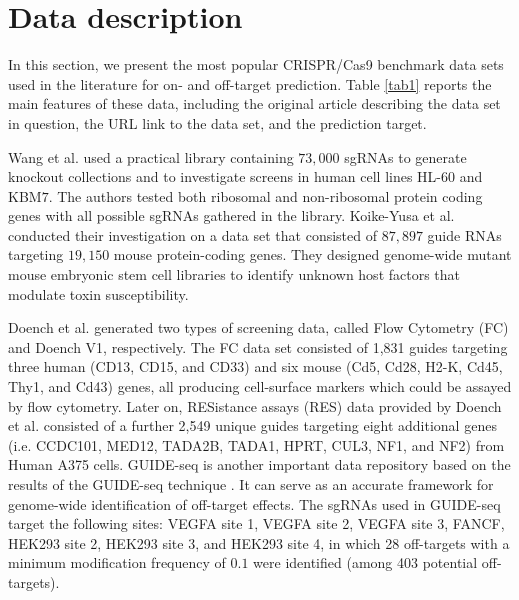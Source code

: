 \documentclass[unnumsec,webpdf,contemporary,large]{oup-authoring-template}
\theoremstyle{thmstyleone}%
\theoremstyle{thmstyletwo}%
\theoremstyle{thmstylethree}%
\begin{document}
\section{Data description}
In this section, we present the most popular CRISPR/Cas9 benchmark data sets used in the literature for on- and off-target prediction. Table \ref{tab1} reports the main features of these data, including the original article describing the data set in question, the URL link to the data set, and the prediction target.

%

Wang et al. \cite{wang2014genetic} used a practical library containing $73,000$ sgRNAs to generate knockout collections and to investigate screens in human cell lines HL-$60$ and KBM$7$. The authors tested both ribosomal and non-ribosomal protein coding genes with all possible sgRNAs gathered in the library. Koike-Yusa et al. \cite{koike2014genome} conducted their investigation on a data set that consisted of $87,897$ guide RNAs targeting $19,150$ mouse protein-coding genes. They designed genome-wide mutant mouse embryonic stem cell libraries to identify unknown host factors that modulate toxin susceptibility. %

Doench et al. \cite{doench2014rational} generated two types of screening data, called Flow Cytometry (FC) and Doench V1, respectively. The FC data set consisted of 1,831 guides targeting three human (CD13, CD15, and CD33) and six mouse (Cd5, Cd28, H2-K, Cd45, Thy1, and Cd43) genes, all producing cell-surface markers which could be assayed by flow cytometry. Later on, RESistance assays (RES) data provided by Doench et al. \cite{doench2016optimized} consisted of a further 2,549 unique guides targeting eight additional  genes (i.e. CCDC101, MED12, TADA2B, TADA1, HPRT, CUL3, NF1, and NF2) from Human A375 cells. GUIDE-seq is another important data repository based on the results of the GUIDE-seq technique \cite{tsai2015guide}. It can serve as an accurate framework for genome-wide identification of off-target effects. The sgRNAs used in GUIDE-seq target the following sites: VEGFA site 1, VEGFA site 2, VEGFA site 3, FANCF, HEK293 site 2, HEK293 site 3, and HEK293 site 4, in which 28 off-targets with a minimum modification frequency of $0.1$ were identified (among 403 potential off-targets). %
\end{document}
